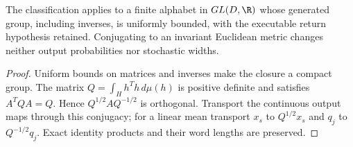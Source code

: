 \begin{proposition}\label{prop:similarity53}
The classification applies to a finite alphabet in $GL(D,\R)$ whose generated group, including inverses, is uniformly bounded, with the executable return hypothesis retained. Conjugating to an invariant Euclidean metric changes neither output probabilities nor stochastic widths.
\end{proposition}
\begin{proof}
Uniform bounds on matrices and inverses make the closure a compact group. The matrix $Q=\int_Hh^Th\,d\mu(h)$ is positive definite and satisfies $A^TQA=Q$. Hence $Q^{1/2}AQ^{-1/2}$ is orthogonal. Transport the continuous output maps through this conjugacy; for a linear mean transport $x_s$ to $Q^{1/2}x_s$ and $q_j$ to $Q^{-1/2}q_j$. Exact identity products and their word lengths are preserved.
\end{proof}
